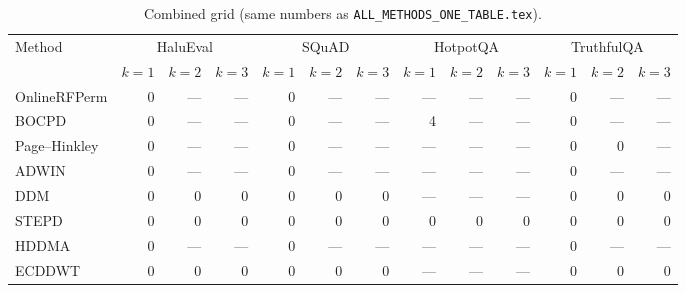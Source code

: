 \documentclass[11pt]{article}
\begin{document}
\begin{table}[h]
\centering
\small
\caption{Combined grid (same numbers as \texttt{ALL\_METHODS\_ONE\_TABLE.tex}).}
\begin{tabular}{lrrrrrrrrrrrr}
\toprule
Method & \multicolumn{3}{c}{HaluEval} & \multicolumn{3}{c}{SQuAD}
 & \multicolumn{3}{c}{HotpotQA} & \multicolumn{3}{c}{TruthfulQA} \\
\cmidrule(lr){2-4} \cmidrule(lr){5-7} \cmidrule(lr){8-10} \cmidrule(lr){11-13}
 & $k{=}1$ & $k{=}2$ & $k{=}3$ & $k{=}1$ & $k{=}2$ & $k{=}3$
 & $k{=}1$ & $k{=}2$ & $k{=}3$ & $k{=}1$ & $k{=}2$ & $k{=}3$ \\
\midrule
OnlineRFPerm & 0 & --- & --- & 0 & --- & --- & --- & --- & --- & 0 & --- & --- \\
BOCPD        & 0 & --- & --- & 0 & --- & --- & 4   & --- & --- & 0 & --- & --- \\
Page--Hinkley& 0 & --- & --- & 0 & --- & --- & --- & --- & --- & 0 & 0   & --- \\
ADWIN        & 0 & --- & --- & 0 & --- & --- & --- & --- & --- & 0 & --- & --- \\
DDM          & 0 & 0   & 0   & 0 & 0   & 0   & --- & --- & --- & 0 & 0   & 0   \\
STEPD        & 0 & 0   & 0   & 0 & 0   & 0   & 0   & 0   & 0   & 0 & 0   & 0   \\
HDDMA        & 0 & --- & --- & 0 & --- & --- & --- & --- & --- & 0 & --- & --- \\
ECDDWT       & 0 & 0   & 0   & 0 & 0   & 0   & --- & --- & --- & 0 & 0   & 0   \\
\bottomrule
\end{tabular}
\end{table}
\end{document}

